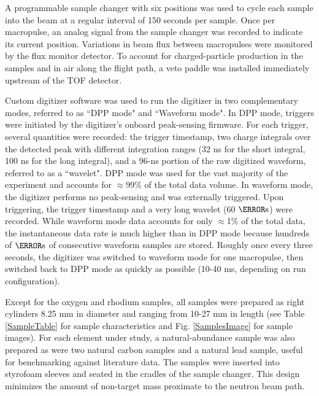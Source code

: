 \documentclass[twocolumn,secnumarabic,amssymb, nobibnotes, aps, prl,
superscriptaddress, nobalancelastpage]{revtex4}
\begin{document}
A programmable sample changer with six positions
was used to cycle each sample into the beam at a regular interval of 150 seconds 
per sample. Once per macropulse, an analog signal from the sample changer was recorded to 
indicate its current position. Variations in beam flux 
between macropulses were monitored by the flux monitor detector. To account for
charged-particle production in the samples and in air along the flight path, a
veto paddle was installed immediately upstream of the TOF detector.

Custom digitizer software was used to run the 
digitizer in two complementary modes, referred to as ``DPP mode" and ``Waveform 
mode". In DPP mode, triggers were initiated by the digitizer's onboard
peak-sensing firmware. For each trigger, several quantities were recorded: the trigger 
timestamp, two charge integrals over the detected peak with different
integration ranges (32 ns for the short integral, 100 ns for the long integral),
and a 96-ns portion of the raw digitized waveform, referred to as a ``wavelet".
DPP mode was used for the vast majority of the 
experiment and accounts for $\approx$99\% of the total data volume. In waveform mode, 
the digitizer performs no peak-sensing and was externally triggered. Upon 
triggering, the trigger timestamp and a very long wavelet (60 $\micro\second$) 
were recorded. While waveform mode data accounts for only $\approx$1\% of the total data, 
the instantaneous data rate is much higher than in DPP 
mode because hundreds of $\micro\second$ of consecutive waveform samples are 
stored. Roughly once every three seconds, the digitizer was switched to 
waveform mode for one macropulse, then switched back to DPP mode as quickly as
possible (10-40 ms, depending on run configuration).  

Except for the oxygen and rhodium samples, all samples were prepared as right
cylinders 8.25 mm in diameter and ranging from 10-27 mm in length (see
Table \ref{SampleTable} for sample characteristics and Fig. \ref{SamplesImage}
for sample images). For each element under study, a natural-abundance sample
was also prepared as were two natural carbon
samples and a natural lead sample, useful for benchmarking against
literature data. The samples
were inserted into styrofoam sleeves and seated in the cradles of the sample
changer. This design minimizes the amount of non-target mass proximate to the
neutron beam path.
\end{document}
